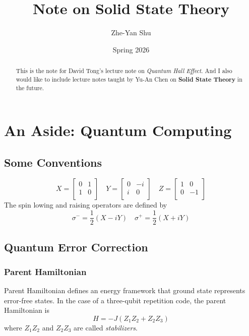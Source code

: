 \documentclass[12pt,a4paper]{article}
\title{Note on Solid State Theory}
\author{Zhe-Yan Shu}
\date{Spring 2026}
\numberwithin{equation}{section}
\begin{document}
\maketitle
\begin{abstract}
    This is the note for David Tong's lecture note on \textit{Quantum Hall Effect}. And I also would like to include lecture notes taught by Yu-An Chen 
    on \textbf{Solid State Theory} in the future.
\end{abstract}
\newpage
\tableofcontents
\newpage

\section{An Aside: Quantum Computing}

\subsection*{Some Conventions}
\[
    X = \begin{bmatrix}
        0 & 1\\
        1 & 0\\
    \end{bmatrix}
    \quad
    Y = \begin{bmatrix}
        0 & -i\\
        i & 0\\
    \end{bmatrix}
    \quad
    Z = \begin{bmatrix}
        1 & 0\\
        0 & -1\\
    \end{bmatrix}
\]
The spin lowing and raising operators are defined by
\[
    \sigma^- = \frac{1}{2}(X-iY) \quad \sigma^+ = \frac{1}{2}(X+iY)
\]

\subsection{Quantum Error Correction}

\subsubsection*{Parent Hamiltonian}
Parent Hamiltonian defines an energy framework that ground state represents error-free states.
In the case of a three-qubit repetition code, the parent Hamiltonian is 
\begin{equation}
    H = -J(Z_1Z_2+Z_2Z_3)
\end{equation}
where $Z_1Z_2$ and $Z_2Z_3$ are called \textit{stabilizers}.
\end{document}
